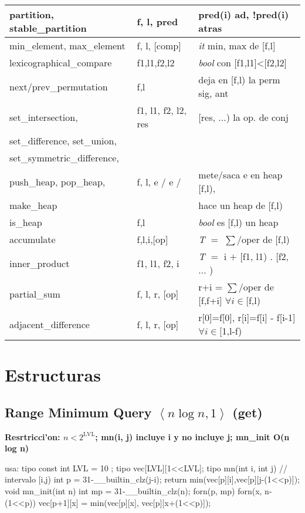 \documentclass[10pt,landscape,twocolumn,a4paper,notitlepage]{article}
\def\nbcoment#1{\begin{small}\textbf{#1}\end{small}}
\begin{document}
\begin{tabular}{|l|l|l|}
partition, stable\_partition & f, l, pred & pred(i) ad, !pred(i) atras \\ \hline
min\_element, max\_element & f, l, [comp] & \textit{it} min, max de [f,l] \\ \hline
lexicographical\_compare & f1,l1,f2,l2 & \textit{bool} con [f1,l1]<[f2,l2] \\ \hline
next/prev\_permutation & f,l & deja en [f,l) la perm sig, ant \\ \hline
set\_intersection, & f1, l1, f2, l2, res & [res, $\ldots$) la op. de conj\\
set\_difference, set\_union, & & \\
set\_symmetric\_difference, & & \\ \hline
push\_heap, pop\_heap, & f, l, e / e / & mete/saca e en heap [f,l), \\
make\_heap & & hace un heap de [f,l) \\ \hline
is\_heap & f,l & \textit{bool} es [f,l) un heap \\ \hline
accumulate & f,l,i,[op] & \textit{T} $=$ $\sum$/oper de [f,l) \\ \hline
inner\_product & f1, l1, f2, i & \textit{T} $=$ i $+$ [f1, l1) . [f2, $\ldots$ ) \\ \hline
partial\_sum & f, l, r, [op] & r+i = $\sum$/oper de [f,f+i] $\forall i \in$[f,l) \\ \hline
adjacent\_difference & f, l, r, [op] & r[0]=f[0], r[i]=f[i] - f[i-1] $\forall i \in$[1,l-f) \\ \hline
\end{tabular}

\section{Estructuras}
\subsection{Range Minimum Query $\left<n \log n, 1\right>$ (get)}
\nbcoment{Resrtricci'on: $n < 2^{\mathrm{LVL}}$; mn(i, j) incluye i y \textbf{no} incluye j; mn\_init O(n log n)}
\begin{code}
usa: tipo
const int LVL = 10 ;
tipo vec[LVL][1<<LVL];
tipo mn(int i, int j) { // intervalo [i,j)
	int p = 31-__builtin_clz(j-i);
	return min(vec[p][i],vec[p][j-(1<<p)]);
}
void mn_init(int n) {
	int mp = 31-__builtin_clz(n);
	forn(p, mp) forn(x, n-(1<<p)) vec[p+1][x] = min(vec[p][x], vec[p][x+(1<<p)]);
}
\end{code}
\end{document}
